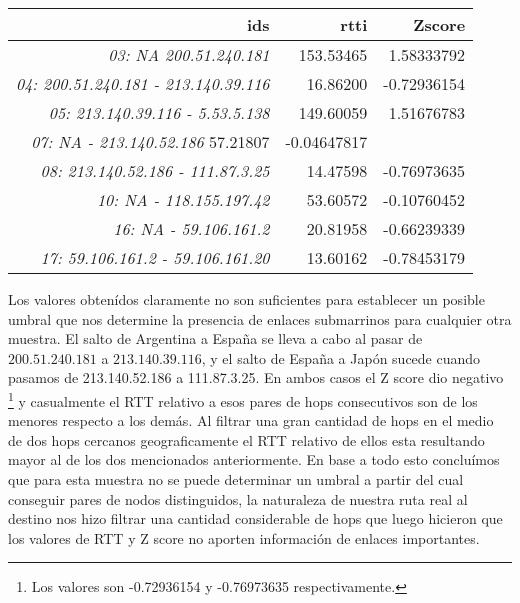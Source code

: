 \begin{table}[h]
    \centering
    \begin{tabular}{r | r | r}
        ids &rtti  &Zscore\\
        \hline\hline
\textit{03: NA  200.51.240.181}& 153.53465& 1.58333792\\
\textit{04: 200.51.240.181 - 213.140.39.116}&  16.86200& -0.72936154\\
\textit{05: 213.140.39.116 - 5.53.5.138}& 149.60059&  1.51676783\\
\textit{07: NA - 213.140.52.186}  57.21807& -0.04647817\\
\textit{08: 213.140.52.186 - 111.87.3.25}&  14.47598& -0.76973635\\
\textit{10: NA - 118.155.197.42}&  53.60572& -0.10760452\\
\textit{16: NA - 59.106.161.2}& 20.81958& -0.66239339\\
\textit{17: 59.106.161.2 - 59.106.161.20}&  13.60162& -0.78453179\\
        \hline\hline
    \end{tabular}
    \bigskip
    \label{tab:tokyo_table}
\end{table}

\par Los valores obten\'idos claramente no son suficientes para establecer un posible umbral que nos determine la presencia de enlaces submarrinos para cualquier otra muestra. El salto de Argentina a Espa\~na se lleva a cabo al pasar de $200.51.240.181$ a $213.140.39.116$, y el salto de Espa\~na a Jap\'on sucede cuando pasamos de 213.140.52.186 a 111.87.3.25. En ambos casos el Z score dio negativo \footnote{Los valores son -0.72936154 y -0.76973635 respectivamente.} y casualmente el RTT relativo a esos pares de hops consecutivos son de los menores respecto a los dem\'as. Al filtrar una gran cantidad de hops en el medio de dos hops cercanos geograficamente el RTT relativo de ellos esta resultando mayor al de los dos mencionados anteriormente. \newline
En base a todo esto conclu\'imos que para esta muestra no se puede determinar un umbral a partir del cual conseguir pares de nodos distinguidos, la naturaleza de nuestra ruta real al destino nos hizo filtrar una cantidad considerable de hops que luego hicieron que los valores de RTT y Z score no aporten informaci\'on de enlaces importantes. 



